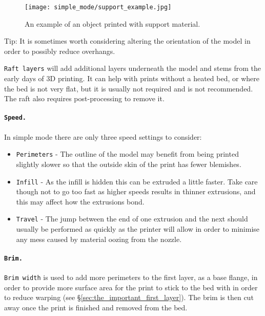 \begin{figure}[H]
\centering
\texttt{[image: simple\_mode/support\_example.jpg]}
\caption{An example of an object printed with support material.}
\label{fig:support_example}
\end{figure}

Tip: It is sometimes worth considering altering the orientation of the model in order to possibly reduce overhangs.

\texttt{Raft layers} will add additional layers underneath the model and stems from the early days of 3D printing.  It can help with prints without a heated bed, or where the bed is not very flat, but it is usually not required and is not recommended.  The raft also requires post-processing to remove it.

\paragraph{\texttt{Speed.}} %
\label{par:simple_speed}
In simple mode there are only three speed settings to consider:
\begin{itemize}
	\item \texttt{Perimeters}  - The outline of the model may benefit from being printed slightly slower so that the outside skin of the print has fewer blemishes.
	\item \texttt{Infill}  - As the infill is hidden this can be extruded a little faster.  Take care though not to go too fast as higher speeds results in thinner extrusions, and this may affect how the extrusions bond.
	\item \texttt{Travel}  - The jump between the end of one extrusion and the next should usually be performed as quickly as the printer will allow in order to minimise any mess caused by material oozing from the nozzle.
\end{itemize}

\paragraph{\texttt{Brim.}} %
\label{par:simple_brim}
\texttt{Brim width} is used to add more perimeters to the first layer, as a base flange, in order to provide more surface area for the print to stick to the bed with in order to reduce warping (see §\ref{sec:the_important_first_layer}). The brim is then cut away once the print is finished and removed from the bed.


